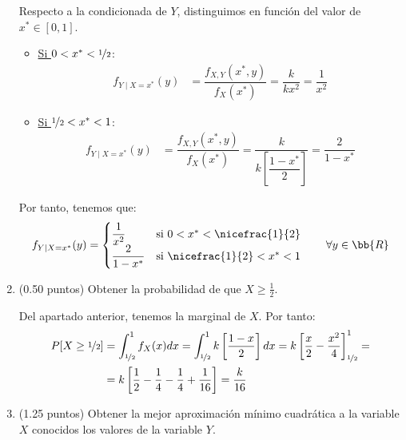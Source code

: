 \documentclass[12pt]{article}
\begin{document}
\begin{ejercicio}[5 puntos]
\begin{enumerate}
            Respecto a la condicionada de $Y$, distinguimos en función del valor de $x^*\in \left[0,1\right]$.
            \begin{itemize}
                \item \ul{Si $0<x^*<\nicefrac{1}{2}$}:
                \begin{align*}
                    f_{Y\mid X=x^*}(y) &= \dfrac{f_{X,Y}(x^*,y)}{f_X(x^*)}
                    = \dfrac{k}{kx^2} = \dfrac{1}{x^2}
                \end{align*}
                \item \ul{Si $\nicefrac{1}{2}<x^*<1$}:
                \begin{align*}
                    f_{Y\mid X=x^*}(y) &= \dfrac{f_{X,Y}(x^*,y)}{f_X(x^*)}
                    = \dfrac{k}{k\left[\dfrac{1-x^*}{2}\right]} = \dfrac{2}{1-x^*}
                \end{align*}
            \end{itemize}

            Por tanto, tenemos que:
            \begin{equation*}
                f_{Y\mid X=x^*}(y) = \begin{cases}
                    \dfrac{1}{x^2} & \text{si } 0<x^*<\nicefrac{1}{2}\\
                    \dfrac{2}{1-x^*} & \text{si } \nicefrac{1}{2}<x^*<1
                \end{cases}
                \qquad \forall y \in \bb{R}
            \end{equation*}

            \item (0.50 puntos) Obtener la probabilidad de que $X \geq \frac{1}{2}$.
            
            Del apartado anterior, tenemos la marginal de $X$. Por tanto:
            \begin{align*}
                P[X \geq \nicefrac{1}{2}] &= \int_{\nicefrac{1}{2}}^{1} f_X(x)dx
                = \int_{\nicefrac{1}{2}}^{1} k\left[\dfrac{1-x}{2}\right]dx
                = k\left[\dfrac{x}{2}-\dfrac{x^2}{4}\right]_{\nicefrac{1}{2}}^{1}
                =\\&= k\left[\dfrac{1}{2}-\dfrac{1}{4}-\dfrac{1}{4}+\dfrac{1}{16}\right]
                = \dfrac{k}{16}
            \end{align*}
            \item (1.25 puntos) Obtener la mejor aproximación mínimo cuadrática a la variable $X$ conocidos los valores de la variable $Y$.\\
            

\end{enumerate}
\end{ejercicio}
\end{document}
